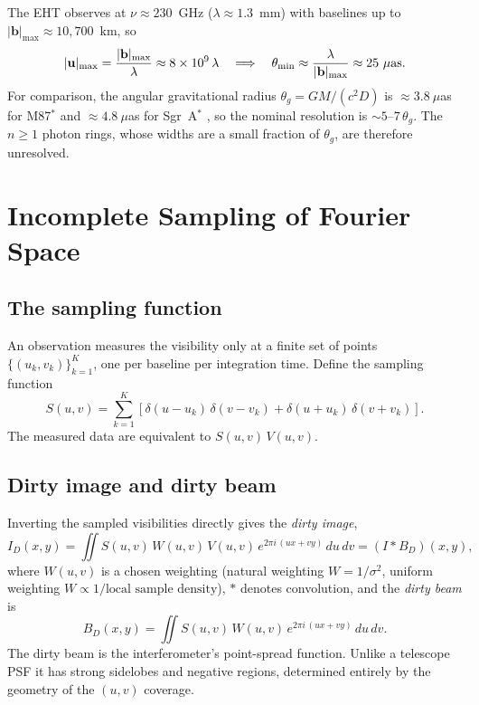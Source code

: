 \documentclass[11pt]{article}
\begin{document}
The EHT observes at $\nu \approx 230$~GHz ($\lambda \approx 1.3$~mm) with
baselines up to $|\mathbf{b}|_{\max} \approx 10{,}700$~km, so
\begin{equation}
|\mathbf{u}|_{\max} = \frac{|\mathbf{b}|_{\max}}{\lambda} \approx 8\times10^{9}\,\lambda
\quad\Longrightarrow\quad
\theta_{\min} \approx \frac{\lambda}{|\mathbf{b}|_{\max}} \approx 25~\mu{\rm as}.
\end{equation}
For comparison, the angular gravitational radius
$\theta_g = GM/(c^2 D)$ is $\approx 3.8~\mu$as for M87$^*$ \cite{EHT2019I} and
$\approx 4.8~\mu$as for Sgr~A$^*$ \cite{EHT2022I}, so the nominal resolution
is $\sim 5$--$7\,\theta_g$. The $n \ge 1$ photon rings, whose widths are a
small fraction of $\theta_g$, are therefore unresolved.

\section{Incomplete Sampling of Fourier Space}

\subsection{The sampling function}

An observation measures the visibility only at a finite set of points
$\{(u_k, v_k)\}_{k=1}^{K}$, one per baseline per integration time. Define the
sampling function
\begin{equation}
S(u,v) = \sum_{k=1}^{K}\left[\delta(u - u_k)\,\delta(v - v_k) + \delta(u + u_k)\,\delta(v + v_k)\right].
\end{equation}
The measured data are equivalent to $S(u,v)\,V(u,v)$.

\subsection{Dirty image and dirty beam}

Inverting the sampled visibilities directly gives the \emph{dirty image},
\begin{equation}
I_D(x,y) = \iint S(u,v)\,W(u,v)\,V(u,v)\,e^{2\pi i\,(ux + vy)}\,du\,dv
= \left(I * B_D\right)(x,y),
\label{eq:dirty}
\end{equation}
where $W(u,v)$ is a chosen weighting (natural weighting $W = 1/\sigma^2$,
uniform weighting $W \propto 1/\text{local sample density}$), $*$ denotes
convolution, and the \emph{dirty beam} is
\begin{equation}
B_D(x,y) = \iint S(u,v)\,W(u,v)\,e^{2\pi i\,(ux + vy)}\,du\,dv.
\end{equation}
The dirty beam is the interferometer's point-spread function. Unlike a
telescope PSF it has strong sidelobes and negative regions, determined
entirely by the geometry of the $(u,v)$ coverage.
\end{document}
